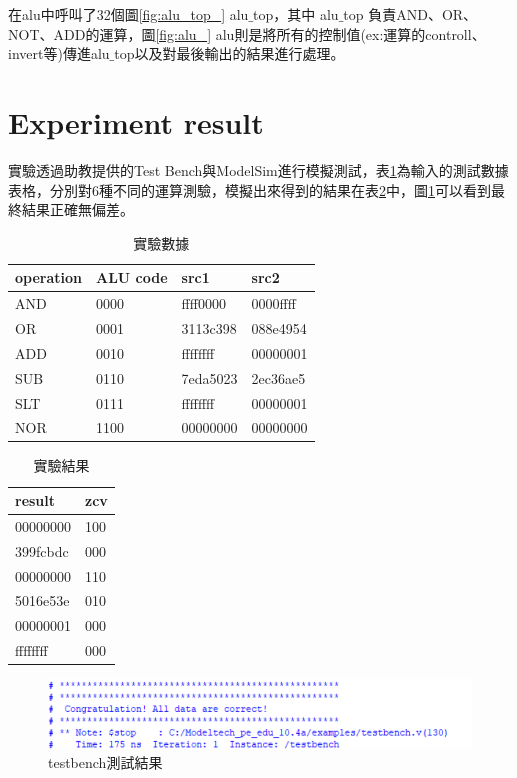 \documentclass[12pt,a4paper]{article}
\theoremstyle{definition}
\begin{document}
在alu中呼叫了32個圖\ref{fig:alu_top_} alu$\_$top，其中 alu$\_$top 負責AND、OR、NOT、ADD的運算，圖\ref{fig:alu_} alu則是將所有的控制值(ex:運算的controll、invert等)傳進alu$\_$top以及對最後輸出的結果進行處理。

\section{Experiment result}

實驗透過助教提供的Test Bench與ModelSim進行模擬測試，表\ref{tab:data}為輸入的測試數據表格，分別對6種不同的運算測驗，模擬出來得到的結果在表\ref{tab:result}中，圖\ref{fig:result}可以看到最終結果正確無偏差。
\begin{table}[H]
\centering
\caption
{實驗數據}
\label{tab:data}
\begin{tabular}{llll} \toprule
operation & ALU code & src1 & src2 \\
\midrule
AND & 0000 & ffff0000 & 0000ffff
\\
OR & 0001 & 3113c398 & 088e4954
\\
ADD & 0010 & ffffffff & 00000001
\\
SUB & 0110 & 7eda5023 & 2ec36ae5
\\
SLT & 0111 & ffffffff & 00000001
\\
NOR & 1100 & 00000000 & 00000000
\\ \bottomrule
\end{tabular}
\end{table}

\begin{table}[H]
\centering
\caption
{實驗結果}
\label{tab:result}
\begin{tabular}{ll} \toprule
result & zcv \\
\midrule
00000000 & 100
\\
399fcbdc & 000
\\
00000000 & 110
\\
5016e53e & 010
\\
00000001 & 000
\\
ffffffff & 000
\\ \bottomrule
\end{tabular}
\end{table}

\begin{figure}[H]
\centering
\includegraphics[width=16cm]{fig/result.png}
\caption{testbench測試結果}
\label{fig:result}
\end{figure}
\end{document}
